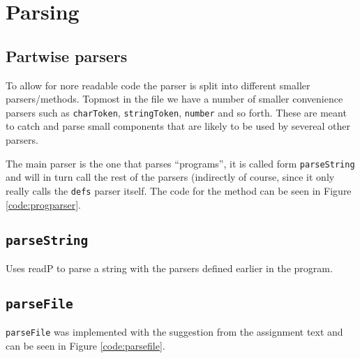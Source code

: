 \section{Parsing}

\subsection{Partwise parsers}
To allow for nore readable code the parser is split into different smaller
parsers/methods. Topmost in the file we have a number of smaller convenience
parsers such as \texttt{charToken}, \texttt{stringToken}, \texttt{number} and so
forth. These are meant to catch and parse small components that are likely to be
used by severeal other parsers.

The main parser is the one that parses ``programs'', it is called form
\texttt{parseString} and will in turn call the rest of the parsers (indirectly
of course, since it only really calls the \texttt{defs} parser itself. The code
for the method can be seen in Figure \ref{code:progparser}.


\subsection{\texttt{parseString}}
Uses readP to parse a string with the parsers defined earlier in the program.




\subsection{\texttt{parseFile}}
\texttt{parseFile} was implemented with the suggestion from the assignment text
and can be seen in Figure \ref{code:parsefile}.

